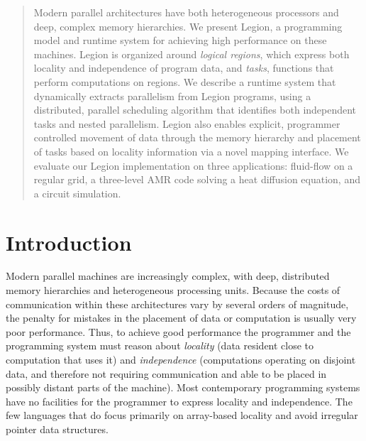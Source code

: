 \documentclass[conference]{IEEEtran}
\begin{document}
\begin{abstract}
Modern parallel architectures have both heterogeneous processors and
deep, complex memory hierarchies.  We present Legion, a programming
model and runtime system for achieving high performance on these
machines.  Legion is organized around {\em logical regions}, which
express both locality and independence of program data, and {\em
  tasks}, functions that perform computations on regions.  We describe
a runtime system that dynamically extracts parallelism from
Legion programs, using a distributed, parallel scheduling algorithm
that identifies both independent tasks and nested parallelism.  Legion
also enables explicit, programmer controlled movement of data through
the memory hierarchy and placement of tasks based on locality
information via a novel mapping interface.  We evaluate our Legion
implementation on three applications: fluid-flow on a regular grid,
a three-level AMR code solving a heat diffusion equation, and 
a circuit simulation.
%
%
\end{abstract}

\section{Introduction}
\label{sect:intro}

Modern parallel machines are increasingly complex, with deep,
distributed memory hierarchies and heterogeneous processing units.  Because the
costs of communication within these architectures vary by several orders of magnitude, 
the penalty for mistakes in the placement of data or computation is usually very poor performance.  Thus,
to achieve good performance the programmer
and the programming system must reason about {\em locality} (data resident
close to computation that uses it) and {\em independence} (computations
operating on disjoint data, and therefore not requiring communication and able to be placed in possibly distant parts of the machine).  
Most contemporary
programming systems have no facilities for the programmer to express locality
and independence.  The few languages that do focus primarily on
array-based locality \cite{Fatahalian06,CHAPEL04,UPC99} and 
avoid irregular pointer data structures.  
%
%
\end{document}
